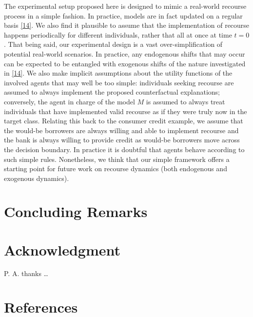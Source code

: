 \documentclass[
  conference]{IEEEtran}
\begin{document}
The experimental setup proposed here is designed to mimic a real-world
recourse process in a simple fashion. In practice, models are in fact
updated on a regular basis
\protect\hyperlink{ref-upadhyay2021towards}{{[}14{]}}. We also find it
plausible to assume that the implementation of recourse happens
periodically for different individuals, rather that all at once at time
\(t=0\). That being said, our experimental design is a vast
over-simplification of potential real-world scenarios. In practice, any
endogenous shifts that may occur can be expected to be entangled with
exogenous shifts of the nature investigated in
\protect\hyperlink{ref-upadhyay2021towards}{{[}14{]}}. We also make
implicit assumptions about the utility functions of the involved agents
that may well be too simple: individuals seeking recourse are assumed to
always implement the proposed counterfactual explanations; conversely,
the agent in charge of the model \(M\) is assumed to always treat
individuals that have implemented valid recourse as if they were truly
now in the target class. Relating this back to the consumer credit
example, we assume that the would-be borrowers are always willing and
able to implement recourse and the bank is always willing to provide
credit as would-be borrowers move across the decision boundary. In
practice it is doubtful that agents behave according to such simple
rules. Nonetheless, we think that our simple framework offers a starting
point for future work on recourse dynamics (both endogenous and
exogenous dynamics).

\hypertarget{sec-conclusion}{%
\section{Concluding Remarks}\label{sec-conclusion}}

\hypertarget{acknowledgment}{%
\section*{Acknowledgment}\label{acknowledgment}}

P. A. thanks \ldots{}

\pagebreak
\FloatBarrier

\hypertarget{references}{%
\section*{References}\label{references}}
\end{document}
